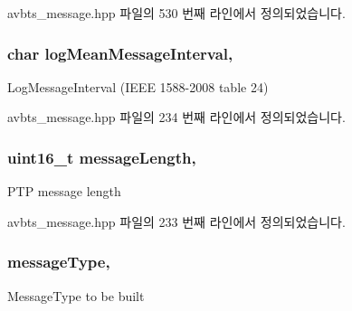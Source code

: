 avbts\+\_\+message.\+hpp 파일의 530 번째 라인에서 정의되었습니다.

\subsubsection[{\texorpdfstring{log\+Mean\+Message\+Interval}{logMeanMessageInterval}}]{\setlength{\rightskip}{0pt plus 5cm}char log\+Mean\+Message\+Interval\hspace{0.3cm}{\ttfamily [protected]}, {\ttfamily [inherited]}}\hypertarget{class_p_t_p_message_common_a2f897c329a52f79528d1b1248254dd1b}{}\label{class_p_t_p_message_common_a2f897c329a52f79528d1b1248254dd1b}
Log\+Message\+Interval (I\+E\+EE 1588-\/2008 table 24) 

avbts\+\_\+message.\+hpp 파일의 234 번째 라인에서 정의되었습니다.

\subsubsection[{\texorpdfstring{message\+Length}{messageLength}}]{\setlength{\rightskip}{0pt plus 5cm}uint16\+\_\+t message\+Length\hspace{0.3cm}{\ttfamily [protected]}, {\ttfamily [inherited]}}\hypertarget{class_p_t_p_message_common_a6c490faee54bca860c4d897aae50990f}{}\label{class_p_t_p_message_common_a6c490faee54bca860c4d897aae50990f}
P\+TP message length 

avbts\+\_\+message.\+hpp 파일의 233 번째 라인에서 정의되었습니다.

\subsubsection[{\texorpdfstring{message\+Type}{messageType}}]{ message\+Type\hspace{0.3cm}{\ttfamily [protected]}, {\ttfamily [inherited]}}\hypertarget{class_p_t_p_message_common_adb32627aa5b0e2dbad3ccd88aab07c05}{}\label{class_p_t_p_message_common_adb32627aa5b0e2dbad3ccd88aab07c05}
Message\+Type to be built 

